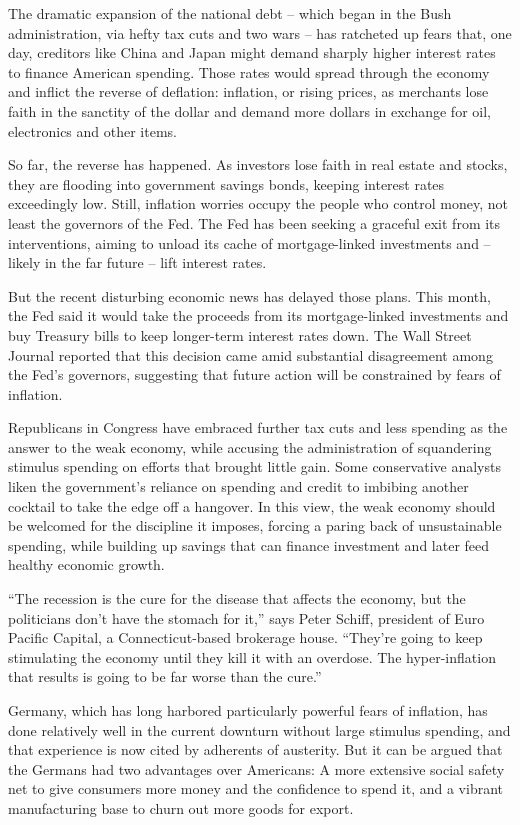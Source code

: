 ﻿\documentclass[12pt]{article}
\begin{document}
The dramatic expansion of the national debt -- which began in the Bush administration, via hefty tax
cuts and two wars -- has ratcheted up fears that, one day, creditors like China and Japan might
demand sharply higher interest rates to finance American spending. Those rates would spread through
the economy and inflict the reverse of deflation: inflation, or rising prices, as merchants lose
faith in the sanctity of the dollar and demand more dollars in exchange for oil, electronics and
other items.

So far, the reverse has happened. As investors lose faith in real estate and stocks, they are
flooding into government savings bonds, keeping interest rates exceedingly low. Still, inflation
worries occupy the people who control money, not least the governors of the Fed. The Fed has been
seeking a graceful exit from its interventions, aiming to unload its cache of mortgage-linked
investments and -- likely in the far future -- lift interest rates.

But the recent disturbing economic news has delayed those plans. This month, the Fed said it would
take the proceeds from its mortgage-linked investments and buy Treasury bills to keep longer-term
interest rates down. The Wall Street Journal reported that this decision came amid substantial
disagreement among the Fed's governors, suggesting that future action will be constrained by fears
of inflation.

Republicans in Congress have embraced further tax cuts and less spending as the answer to the weak
economy, while accusing the administration of squandering stimulus spending on efforts that brought
little gain. Some conservative analysts liken the government's reliance on spending and credit to
imbibing another cocktail to take the edge off a hangover. In this view, the weak economy should be
welcomed for the discipline it imposes, forcing a paring back of unsustainable spending, while
building up savings that can finance investment and later feed healthy economic growth.

``The recession is the cure for the disease that affects the economy, but the politicians don't have
the stomach for it,'' says Peter Schiff, president of Euro Pacific Capital, a Connecticut-based
brokerage house. ``They're going to keep stimulating the economy until they kill it with an
overdose. The hyper-inflation that results is going to be far worse than the cure.''

Germany, which has long harbored particularly powerful fears of inflation, has done relatively well
in the current downturn without large stimulus spending, and that experience is now cited by
adherents of austerity. But it can be argued that the Germans had two advantages over Americans: A
more extensive social safety net to give consumers more money and the confidence to spend it, and a
vibrant manufacturing base to churn out more goods for export.
\end{document}
